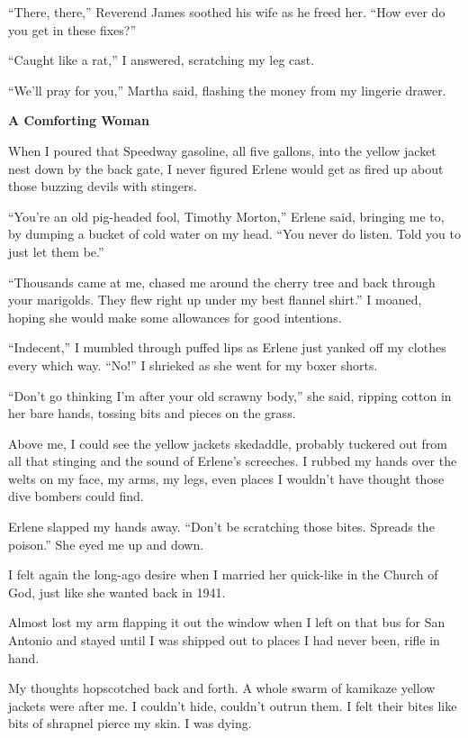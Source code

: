 \documentclass[
]{article}
\begin{document}
``There, there,'' Reverend James soothed his wife as he freed her. ``How
ever do you get in these fixes?''

``Caught like a rat,'' I answered, scratching my leg cast.

``We'll pray for you,'' Martha said, flashing the money from my lingerie
drawer.

\textbf{\hfill\break
}

\textbf{A Comforting Woman}

When I poured that Speedway gasoline, all five gallons, into the yellow
jacket nest down by the back gate, I never figured Erlene would get as
fired up about those buzzing devils with stingers.

``You're an old pig-headed fool, Timothy Morton,'' Erlene said, bringing
me to, by dumping a bucket of cold water on my head. ``You never do
listen. Told you to just let them be.''

``Thousands came at me, chased me around the cherry tree and back
through your marigolds. They flew right up under my best flannel
shirt.'' I moaned, hoping she would make some allowances for good
intentions.

``Indecent,'' I mumbled through puffed lips as Erlene just yanked off my
clothes every which way. ``No!'' I shrieked as she went for my boxer
shorts.

``Don't go thinking I'm after your old scrawny body,'' she said, ripping
cotton in her bare hands, tossing bits and pieces on the grass.

Above me, I could see the yellow jackets skedaddle, probably tuckered
out from all that sting­ing and the sound of Erlene's screeches. I
rubbed my hands over the welts on my face, my arms, my legs, even places
I wouldn't have thought those dive bombers could find.

Erlene slapped my hands away. ``Don't be scratching those bites. Spreads
the poison.'' She eyed me up and down.

I felt again the long-ago desire when I married her quick-like in the
Church of God, just like she wanted back in 1941.

Almost lost my arm flapping it out the window when I left on that bus
for San Antonio and stayed until I was shipped out to places I had never
been, rifle in hand.

My thoughts hopscotched back and forth. A whole swarm of kamikaze yellow
jackets were after me. I couldn't hide, couldn't outrun them. I felt
their bites like bits of shrapnel pierce my skin. I was dying.
\end{document}
